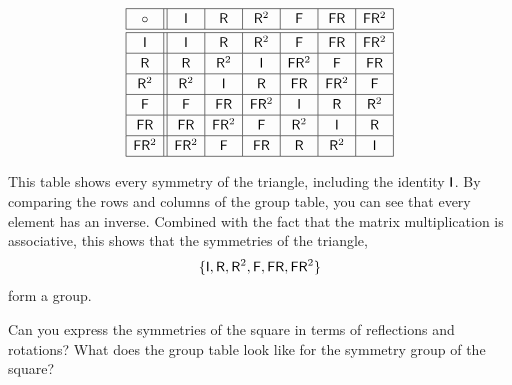 \[
{
\renewcommand{\arraystretch}{1.2}
\begin{array}{| c || c | c | c |c | c | c |}
\hline
\circ & \mat{I} & \mat{R} & \mat{R}^2  & \mat{F} & \mat{F} \mat{R} &  \mat{F} \mat{R}^2  \\ \hline \hline
\mat{I} & \mat{I} & \mat{R} & \mat{R}^2 & \mat{F} & \mat{F} \mat{R} & \mat{F} \mat{R}^2 \\ \hline
\mat{R} & \mat{R} & \mat{R}^2 & \mat{I} & \mat{F} \mat{R}^2 & \mat{F} & \mat{F} \mat{R} \\ \hline
\mat{R}^2 & \mat{R}^2 & \mat{I} & \mat{R} & \mat{F} \mat{R} & \mat{F} \mat{R}^2 & \mat{F}  \\ \hline
\mat{F} & \mat{F} & \mat{F} \mat{R} & \mat{F} \mat{R}^2 & \mat{I} & \mat{R} & \mat{R}^2 \\ \hline
\mat{F} \mat{R} & \mat{F} \mat{R} & \mat{F} \mat{R}^2 & \mat{F} & \mat{R}^2 & \mat{I} & \mat{R}  \\ \hline
\mat{F} \mat{R}^2 & \mat{F} \mat{R}^2 & \mat{F} & \mat{F} \mat{R} & \mat{R} & \mat{R}^2 & \mat{I}\\ \hline
\end{array}}
\]

This table shows every symmetry of the triangle, including the
identity $\mathsf{I}$. By comparing the rows and columns of the group
table, you can see that every element has an inverse. Combined
with the fact that the matrix multiplication is associative, this shows that
the symmetries of the triangle,
\[
\{ \mathsf{I},\mathsf{R},\mathsf{R}^2,\mathsf{F},\mathsf{F} \mathsf{R},  \mathsf{F} \mathsf{R}^2\}
\]
form a group.

\begin{ques} 
Can you express the symmetries of the square in terms of reflections
and rotations? What does the group table look like for the symmetry
group of the square?
\end{ques}
\QM



\newpage

